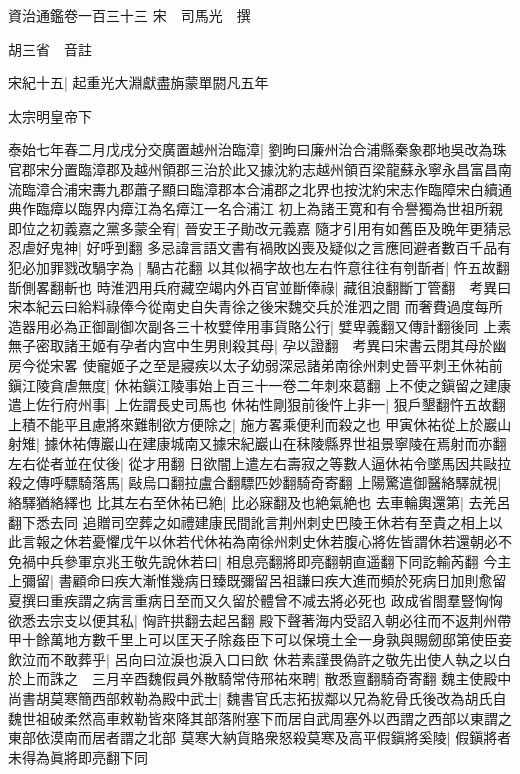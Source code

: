 資治通鑑卷一百三十三
宋　司馬光　撰

胡三省　音註

宋紀十五|{
	起重光大淵獻盡旃蒙單閼凡五年}


太宗明皇帝下

泰始七年春二月戊戌分交廣置越州治臨漳|{
	劉昫曰廉州治合浦縣秦象郡地吳改為珠官郡宋分置臨漳郡及越州領郡三治於此又據沈約志越州領百梁龍蘇永寧永昌富昌南流臨漳合浦宋夀九郡蕭子顯曰臨漳郡本合浦郡之北界也按沈約宋志作臨障宋白續通典作臨瘴以臨界内瘴江為名瘴江一名合浦江}
初上為諸王寛和有令譽獨為世祖所親即位之初義嘉之黨多蒙全宥|{
	晉安王子勛改元義嘉}
隨才引用有如舊臣及晩年更猜忌忍虐好鬼神|{
	好呼到翻}
多忌諱言語文書有禍敗凶喪及疑似之言應囘避者數百千品有犯必加罪戮改騧字為|{
	騧古花翻}
以其似禍字故也左右忤意往往有刳斮者|{
	忤五故翻斮側畧翻斬也}
時淮泗用兵府藏空竭内外百官並斷俸祿|{
	藏徂浪翻斷丁管翻　考異曰宋本紀云曰給料祿俸今從南史自失青徐之後宋魏交兵於淮泗之間}
而奢費過度每所造器用必為正御副御次副各三十枚嬖倖用事貨賂公行|{
	嬖卑義翻又傳計翻後同}
上素無子密取諸王姬有孕者内宫中生男則殺其母|{
	孕以證翻　考異曰宋書云閉其母於幽房今從宋畧}
使寵姬子之至是寢疾以太子幼弱深忌諸弟南徐州刺史晉平刺王休祐前鎭江陵貪虐無度|{
	休祐鎭江陵事始上百三十一卷二年刺來葛翻}
上不使之鎭留之建康遣上佐行府州事|{
	上佐謂長史司馬也}
休祐性剛狠前後忤上非一|{
	狠戶墾翻忤五故翻}
上積不能平且慮將來難制欲方便除之|{
	施方畧乘便利而殺之也}
甲寅休祐從上於巖山射雉|{
	據休祐傳巖山在建康城南又據宋紀巖山在秣陵縣界世祖景寧陵在焉射而亦翻}
左右從者並在仗後|{
	從才用翻}
日欲闇上遣左右壽寂之等數人逼休祐令墜馬因共敺拉殺之傳呼驃騎落馬|{
	敺烏口翻拉盧合翻驃匹妙翻騎奇寄翻}
上陽驚遣御醫絡驛就視|{
	絡驛猶絡繹也}
比其左右至休祐已絶|{
	比必寐翻及也絶氣絶也}
去車輪輿還第|{
	去羌呂翻下悉去同}
追贈司空葬之如禮建康民間訛言荆州刺史巴陵王休若有至貴之相上以此言報之休若憂懼戊午以休若代休祐為南徐州刺史休若腹心將佐皆謂休若還朝必不免禍中兵參軍京兆王敬先說休若曰|{
	相息亮翻將即亮翻朝直遥翻下同訖輸芮翻}
今主上彌留|{
	書顧命曰疾大漸惟幾病日臻既彌留呂祖謙曰疾大進而頻於死病日加則愈留夏撰曰重疾謂之病言重病日至而又久留於體曾不减去將必死也}
政成省閤羣豎恟恟欲悉去宗支以便其私|{
	恟許拱翻去起呂翻}
殿下聲著海内受詔入朝必往而不返荆州帶甲十餘萬地方數千里上可以匡天子除姦臣下可以保境土全一身孰與賜劒邸第使臣妾飲泣而不敢葬乎|{
	呂向曰泣淚也淚入口曰飲}
休若素謹畏偽許之敬先出使人執之以白於上而誅之　三月辛酉魏假員外散騎常侍邢祐來聘|{
	散悉亶翻騎奇寄翻}
魏主使殿中尚書胡莫寒簡西部敕勒為殿中武士|{
	魏書官氏志拓拔鄰以兄為紇骨氏後改為胡氏自魏世祖破柔然高車敕勒皆來降其部落附塞下而居自武周塞外以西謂之西部以東謂之東部依漠南而居者謂之北部}
莫寒大納貨賂衆怒殺莫寒及高平假鎭將奚陵|{
	假鎭將者未得為眞將即亮翻下同}
